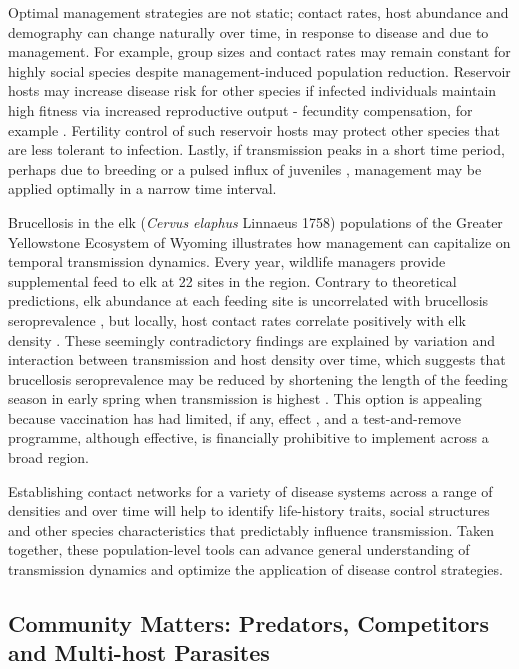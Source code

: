 Optimal management strategies are not static; contact rates, host abundance and demography can change naturally over time, in response to disease and due to management.
For example, group sizes and contact rates may remain constant for highly social species despite management-induced population reduction.
Reservoir hosts may increase disease risk for other species if infected individuals maintain high fitness via increased reproductive output - fecundity compensation, for example \citep{Schwanz2008a}.
Fertility control of such reservoir hosts may protect other species that are less tolerant to infection.
Lastly, if transmission peaks in a short time period, perhaps due to breeding or a pulsed influx of juveniles \citep{altizer2006seasonality}, management may be applied optimally in a narrow time interval.

Brucellosis in the elk (\textit{Cervus elaphus} Linnaeus 1758) populations of the Greater Yellowstone Ecosystem of Wyoming illustrates how management can capitalize on temporal transmission dynamics.
Every year, wildlife managers provide supplemental feed to elk at 22 sites in the region.
Contrary to theoretical predictions, elk abundance at each feeding site is uncorrelated with brucellosis seroprevalence \citep{Cross2007b}, but locally, host contact rates correlate positively with elk density \citep{creech2012effects}.
These seemingly contradictory findings are explained by variation and interaction between transmission and host density over time, which suggests that brucellosis seroprevalence may be reduced by shortening the length of the feeding season in early spring when transmission is highest \citep{maichak2009effects}.
This option is appealing because vaccination has had limited, if any, effect \citep{Cross2007b}, and a test-and-remove programme, although effective, is financially prohibitive to implement across a broad region.

Establishing contact networks for a variety of disease systems across a range of densities and over time will help to identify life-history traits, social structures and other species characteristics that predictably influence transmission.
Taken together, these population-level tools can advance general understanding of transmission dynamics and optimize the application of disease control strategies.

\subsection{Community Matters: Predators, Competitors and Multi-host Parasites}

